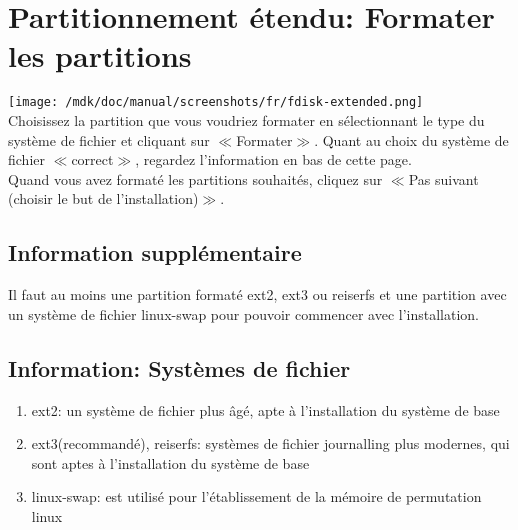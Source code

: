 \section{Partitionnement \'etendu: Formater les partitions}
\texttt{[image: /mdk/doc/manual/screenshots/fr/fdisk-extended.png]} \\
Choisissez la partition que vous voudriez formater en s\'electionnant le type du syst\`eme de fichier et cliquant sur $\ll$Formater$\gg$. Quant au choix du syst\`eme de fichier $\ll$correct$\gg$, regardez l'information en bas de cette page.\\
Quand vous avez format\'e les partitions souhait\'es, cliquez sur $\ll$Pas suivant (choisir le but de l'installation)$\gg$.\\
\subsection{Information suppl\'ementaire}
Il faut au moins une partition format\'e ext2, ext3 ou reiserfs et une partition avec un syst\`eme de fichier linux-swap pour pouvoir commencer avec l'installation.\\
\subsection{Information: Syst\`emes de fichier}
\begin{enumerate}
\item ext2: un syst\`eme de fichier plus \^ag\'e, apte \`a l'installation du syst\`eme de base\\
\item ext3(recommand\'e), reiserfs: syst\`emes de fichier journalling plus modernes, qui sont aptes \`a l'installation du syst\`eme de base \\
\item linux-swap: est utilis\'e pour l'\'etablissement de la m\'emoire de permutation linux\\
\end{enumerate}
